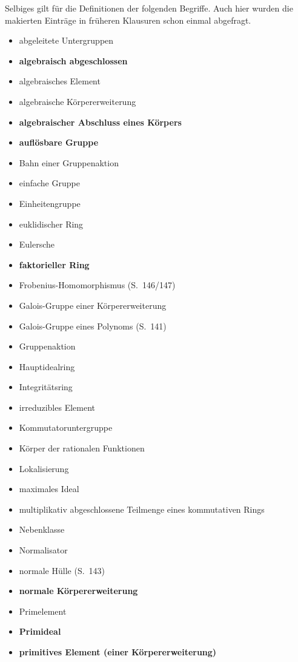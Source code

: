 Selbiges gilt für die Definitionen der folgenden Begriffe.
Auch hier wurden die makierten Einträge in früheren Klausuren schon einmal abgefragt.
\begin{itemize}
  \item
    abgeleitete Untergruppen
  \item
    \textbf{algebraisch abgeschlossen}
  \item
    algebraisches Element
  \item
    algebraische Körpererweiterung
  \item
    \textbf{algebraischer Abschluss eines Körpers}
  \item
    \textbf{auflösbare Gruppe}
  \item
    Bahn einer Gruppenaktion
  \item
    einfache Gruppe
  \item
    Einheitengruppe
  \item
    euklidischer Ring
  \item
    Eulersche~\Funktion{$\varphi$}
  \item
    \textbf{faktorieller Ring}
  \item
    Frobenius-Homomorphismus (S.~146/147)
  \item
    Galois-Gruppe einer Körpererweiterung
  \item
    Galois-Gruppe eines Polynoms (S.~141)
  \item
    Gruppenaktion
  \item
    Hauptidealring
  \item
    Integritätsring
  \item
    irreduzibles Element
  \item
    Kommutatoruntergruppe
  \item
    Körper der rationalen Funktionen
  \item
    Lokalisierung
  \item
    maximales Ideal
  \item
    multiplikativ abgeschlossene Teilmenge eines kommutativen Rings
  \item
    Nebenklasse
  \item
    Normalisator
  \item
    normale Hülle (S.~143)
  \item
    \textbf{normale Körpererweiterung}
  \item
    Primelement
  \item
    \textbf{Primideal}
  \item
    \textbf{primitives Element (einer Körpererweiterung)}

\end{itemize}
